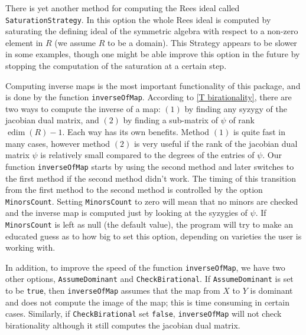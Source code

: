 \documentclass[11pt]{amsart}
\numberwithin{equation}{theorem}
\renewcommand{\:}{\colon}
\DeclareMathOperator{\edim}{edim}
\theoremstyle{theorem}
\begin{document}
There is yet another method for computing the Rees ideal called {\tt SaturationStrategy}. In this option the whole Rees ideal is computed by saturating the defining ideal of the symmetric algebra with respect to a non-zero element in $R$ (we assume $R$ to be a domain). This Strategy appears to be slower in some examples, though one might be able improve this option in the future by stopping the computation of the saturation at a certain step.

Computing inverse maps is the most important functionality of this package, and is done by the function {\tt inverseOfMap}. According to \autoref{T birationality}, there are two ways to compute the inverse of a map: $(1)$ by finding any syzygy of the jacobian dual matrix, and $(2)$ by finding a sub-matrix of $\psi$ of rank $\edim(R)-1$. Each way has its own benefits. Method $(1)$ is quite fast in many cases, however method $(2)$ is very useful if the rank of the jacobian dual matrix  $\psi$ is relatively small compared to the degrees of the entries of $\psi$. Our function {\tt inverseOfMap} starts by using the second method and later switches to the first method if the second method didn't work.  The timing of this transition from the first method to the second method is controlled by the option {\tt MinorsCount}. Setting {\tt MinorsCount} to zero will mean that no minors are checked and the inverse map is computed just by looking at the syzygies of $\psi$.  If {\tt MinorsCount} is left as null (the default value), the program will try to make an educated guess as to how big to set this option, depending on varieties the user is working with.

 In addition, to improve the speed of the function {\tt inverseOfMap}, we have two other options, {\tt AssumeDominant} and {\tt CheckBirational}. If {\tt AssumeDominant} is set  to be {\tt true},  then  {\tt inverseOfMap} assumes that the map from $X$ to $Y$ is dominant and does not compute the image of the map; this is time consuming in certain cases.
 Similarly, if {\tt CheckBirational} set {\tt false}, {\tt inverseOfMap} will  not check birationality although it still computes the jacobian dual matrix.
\end{document}
